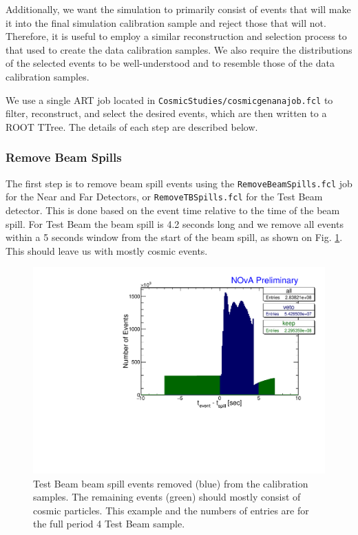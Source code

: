 Additionally, we want the simulation to primarily consist of events that will make it into the final simulation calibration sample and reject those that will not. Therefore, it is useful to employ a similar reconstruction and selection process to that used to create the data calibration samples. We also require the distributions of the selected events to be well-understood and to resemble those of the data calibration samples.

We use a single ART job located in \texttt{CosmicStudies/cosmicgenanajob.fcl} to filter, reconstruct, and select the desired events, which are then written to a ROOT TTree. The details of each step are described below.

\subsubsection*{Remove Beam Spills}
The first step is to remove beam spill events using the \texttt{RemoveBeamSpills.fcl} job for the Near and Far Detectors, or \texttt{RemoveTBSpills.fcl} for the Test Beam detector. This is done based on the event time relative to the time of the beam spill. For Test Beam the beam spill is 4.2 seconds long and we remove all events within a 5 seconds window from the start of the beam spill, as shown on Fig. \ref{figRemoveTBSpills}. This should leave us with mostly cosmic events.

\begin{figure}[hbtp]
\centering
\includegraphics[width=\textwidth]{Plots/DataBasedSimulation/RemoveTBSpills.pdf}
\caption{Test Beam beam spill events removed (blue) from the calibration samples. The remaining events (green) should mostly consist of cosmic particles. This example and the numbers of entries are for the full period 4 Test Beam sample.}
\label{figRemoveTBSpills}
\end{figure}

